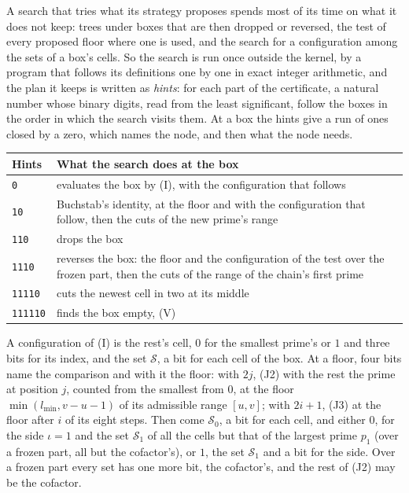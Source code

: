 \documentclass[11pt]{article}
\theoremstyle{definition}
\begin{document}
A search that tries what its strategy proposes spends most of its time on what it does not keep: trees under boxes
that are then dropped or reversed, the test of every proposed floor where one is used, and the search for a
configuration among the sets of a box's cells. So the search is run once outside the kernel, by a program that
follows its definitions one by one in exact integer arithmetic, and the plan it keeps is written as \emph{hints}: for
each part of the certificate, a natural number whose binary digits, read from the least significant, follow the boxes
in the order in which the search visits them. At a box the hints give a run of ones closed by a zero, which names the
node, and then what the node needs.
\begin{center}
\small
\begin{tabular}{@{}lp{}@{}}
\toprule
Hints & What the search does at the box \\
\midrule
\texttt{0} & evaluates the box by (I), with the configuration that follows \\
\texttt{10} & Buchstab's identity, at the floor and with the configuration that follow, then the cuts of the new
  prime's range \\
\texttt{110} & drops the box \\
\texttt{1110} & reverses the box: the floor and the configuration of the test over the frozen part, then the cuts of
  the range of the chain's first prime \\
\texttt{11110} & cuts the newest cell in two at its middle \\
\texttt{111110} & finds the box empty, (V) \\
\bottomrule
\end{tabular}
\end{center}
A configuration of (I) is the rest's cell, $0$ for the smallest prime's or $1$ and three bits for its index, and the
set $\mathcal S$, a bit for each cell of the box. At a floor, four bits name the comparison and with it the floor: with
$2j$, (J2) with the rest the prime at position $j$, counted from the smallest from $0$, at the floor $\min(l_{\min}, v
- u - 1)$ of its admissible range $[u, v]$; with $2i + 1$, (J3) at the floor after $i$ of its eight steps. Then come
$\mathcal S_0$, a bit for each cell, and either $0$, for the side $\iota = 1$ and the set $\mathcal S_1$ of all the
cells but that of the largest prime $p_1$ (over a frozen part, all but the cofactor's), or $1$, the set $\mathcal S_1$
and a bit for the side. Over a frozen part every set has one more bit, the cofactor's, and the rest
of (J2) may be the cofactor.
\end{document}
